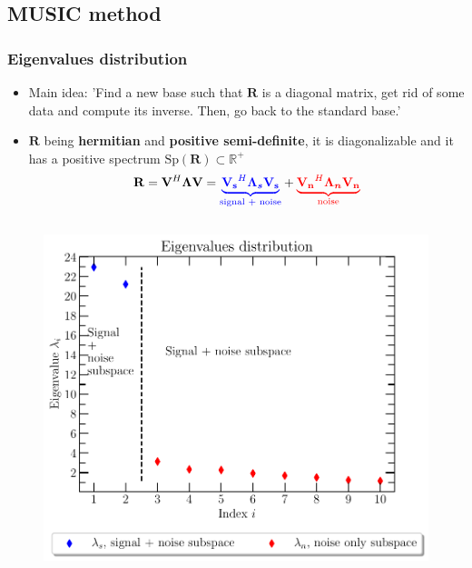 \documentclass[UKenglish,8pt,aspectratio=1610]{beamer}
\begin{document}
	\subsection{MUSIC method}
	\begin{frame}
		\frametitle{Eigenvalues distribution \cite{twoDecades,uncini,Johnson1993ArraySP}}
		\begin{itemize}
			\item Main idea: 'Find a new base such that $\mathbf{R}$ is a diagonal matrix, get rid of some data and compute its inverse. Then, go back to the standard base.'
			\item $\mathbf{R}$ being \textbf{hermitian} and \textbf{positive semi-definite}, it is diagonalizable and it has a positive spectrum $\text{Sp}(\mathbf{R})\subset\mathbb{R}^{+}$
			\begin{equation}
				\mathbf{R}=\mathbf{V}^H\boldsymbol{\Lambda}\mathbf{V} = \textcolor{blue}{\underbrace{\mathbf{V_s}^H\boldsymbol{\Lambda_s}\mathbf{V_s}}_{\text{signal + noise}} }+ \textcolor{red}{\underbrace{\mathbf{V_n}^H\boldsymbol{\Lambda_n}\mathbf{V_n}}_{\text{noise}}}
		\end{equation}
		\end{itemize}
		\begin{columns}
		\begin{column}{0.5\textwidth}
			\begin{figure}[h!]
				\vspace{-15pt}
				\centering
				\includegraphics[scale=0.4]{question4/part_A_question_4_eigenvalues_distribution.pdf}

\end{figure}
\end{column}
\end{columns}
\end{frame}
\end{document}
